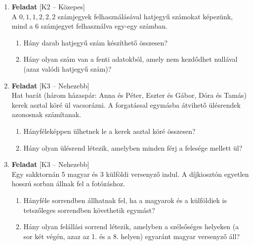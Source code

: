 \documentclass[12pt,a4paper]{article}
\begin{document}
\begin{enumerate}[label=\arabic*., leftmargin=*]
    \vspace{0.4cm}

    \item \textbf{Feladat} \textsf{\small [K2 – Közepes]} \\
    A $0, 1, 1, 2, 2, 2$ számjegyek felhasználásával hatjegyű számokat képezünk, mind a 6 számjegyet felhasználva egy-egy számban.
    \begin{enumerate}[label=\alph*)]
        \item Hány darab hatjegyű szám készíthető összesen?
        \item Hány olyan szám van a fenti adatokból, amely nem kezdődhet nullával (azaz valódi hatjegyű szám)?
    \end{enumerate}

    \vspace{0.4cm}

    \item \textbf{Feladat} \textsf{\small [K3 – Nehezebb]} \\
    Hat barát (három házaspár: Anna és Péter, Eszter és Gábor, Dóra és Tamás) kerek asztal köré ül vacsorázni. A forgatással egymásba átvihető ülésrendek azonosnak számítanak.
    \begin{enumerate}[label=\alph*)]
        \item Hányféleképpen ülhetnek le a kerek asztal köré összesen?
        \item Hány olyan ülésrend létezik, amelyben minden férj a felesége mellett ül?
    \end{enumerate}

    \vspace{0.4cm}

    \item \textbf{Feladat} \textsf{\small [K3 – Nehezebb]} \\
    Egy sakktornán 5 magyar és 3 külföldi versenyző indul. A díjkiosztón egyetlen hosszú sorban állnak fel a fotózáshoz.
    \begin{enumerate}[label=\alph*)]
        \item Hányféle sorrendben állhatnak fel, ha a magyarok és a külföldiek is tetszőleges sorrendben követhetik egymást?
        \item Hány olyan felállási sorrend létezik, amelyben a szélsőséges helyeken (a sor két végén, azaz az 1. és a 8. helyen) egyaránt magyar versenyző áll?
    \end{enumerate}

    \vspace{0.4cm}


\end{enumerate}
\end{document}
